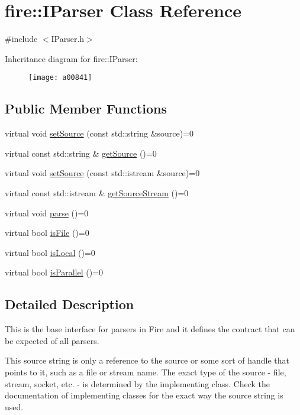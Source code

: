 \hypertarget{a00841}{}\section{fire\+:\+:I\+Parser Class Reference}
\label{a00841}


{\ttfamily \#include $<$I\+Parser.\+h$>$}

Inheritance diagram for fire\+:\+:I\+Parser\+:\begin{figure}[H]
\begin{center}
\leavevmode
\texttt{[image: a00841]}
\end{center}
\end{figure}
\subsection*{Public Member Functions}
\begin{DoxyCompactItemize}
\item 
virtual void \hyperlink{a00841_a0dbeff2b9bd8dbfb2aad7a424eef87d1}{set\+Source} (const std\+::string \&source)=0
\item 
virtual const std\+::string \& \hyperlink{a00841_ab55d2644dfa6d950d1f874e1e02df095}{get\+Source} ()=0
\item 
virtual void \hyperlink{a00841_a7748a633910e9bfc27411d6bd840496b}{set\+Source} (const std\+::istream \&source)=0
\item 
virtual const std\+::istream \& \hyperlink{a00841_ac94c7a288bf669322b93ba171c43f90e}{get\+Source\+Stream} ()=0
\item 
virtual void \hyperlink{a00841_af36ac6eedd8c27d2f418869193d7d03c}{parse} ()=0
\item 
virtual bool \hyperlink{a00841_a616c42c85d781c916e97f0ad8f1e9010}{is\+File} ()=0
\item 
virtual bool \hyperlink{a00841_a97b9e58493b3cadbc63e670b0b0e759f}{is\+Local} ()=0
\item 
virtual bool \hyperlink{a00841_a83d2882a466d694fb0aea3d846bcbed4}{is\+Parallel} ()=0
\end{DoxyCompactItemize}


\subsection{Detailed Description}
This is the base interface for parsers in Fire and it defines the contract that can be expected of all parsers.

This source string is only a reference to the source or some sort of handle that points to it, such as a file or stream name. The exact type of the source -\/ file, stream, socket, etc. -\/ is determined by the implementing class. Check the documentation of implementing classes for the exact way the source string is used.

